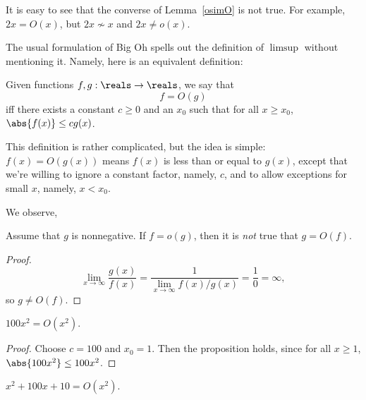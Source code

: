 It is easy to see that the converse of Lemma~\ref{osimO} is not true.  For
example, $2x = O(x)$, but $2x \not\sim x$ and $2x \neq o(x)$.

The usual formulation of Big Oh spells out the definition of $\limsup$
without mentioning it.  Namely, here is an equivalent definition:
\begin{definition}
Given functions $f, g : \reals \to \reals$, we say that
\[
f = O(g)
\]
iff there exists a constant $c \geq 0$ and an $x_0$ such that for all $x \geq
x_0$, $\abs{f(x)} \leq c g(x)$.
\end{definition}

This definition is rather complicated, but the idea is simple: $f(x) =
O(g(x))$ means $f(x)$ is less than or equal to $g(x)$, except that we're
willing to ignore a constant factor, namely, $c$, and to allow exceptions for
small $x$, namely, $x < x_0$.

We observe,
\begin{lemma}
Assume that $g$ is nonnegative.
If $f = o(g)$, then it is \emph{not} true that $g = O(f)$.
\end{lemma}
\begin{proof}
\[
\lim_{x \rightarrow \infty} \frac{g(x)}{f(x)} =
 \frac{1}{\lim_{x \rightarrow \infty} f(x)/g(x)} =
 \frac{1}{0} = \infty,
\]
so $g \neq O(f)$.

\end{proof}

\begin{proposition}
$100x^2 = O(x^2)$.
\end{proposition}

\begin{proof}
Choose $c = 100$ and $x_0 = 1$.  Then the proposition holds, since for all
$x \geq 1$, $\abs{100x^2} \leq 100 x^2$.
\end{proof}

\begin{proposition}\label{x2O}
$x^2 + 100x + 10 = O(x^2)$.
\end{proposition}

